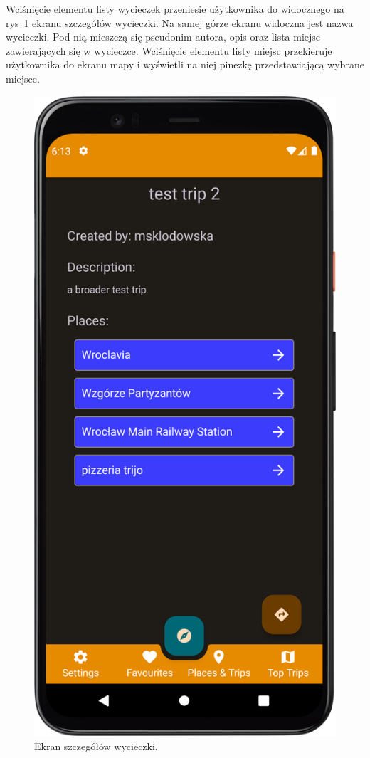         Wciśnięcie elementu listy wycieczek przeniesie użytkownika do widocznego na rys~\ref{trip_det} ekranu szczegółów wycieczki. Na samej górze ekranu widoczna jest nazwa wycieczki.
        Pod nią mieszczą się pseudonim autora, opis oraz lista miejsc zawierających się w wycieczce. Wciśnięcie elementu listy miejsc przekieruje użytkownika do ekranu mapy i wyświetli na niej
        pinezkę przedstawiającą wybrane miejsce.

        \vspace{1cm}
        \begin{figure}[H]
            \centering
            \includegraphics[scale=0.10]{src/app/trip.png}
            \caption{Ekran szczegółów wycieczki.\label{trip_det}}
            \qquad
        \end{figure} 
        \vspace{1cm}

